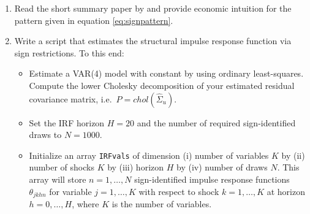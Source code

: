 \documentclass{article}
\begin{document}
\begin{enumerate}
\item Read the short summary paper by \textcite{Wolf_2022_WhatCanWe} and provide economic intuition for the pattern given in equation \eqref{eq:signpattern}.
\item Write a script that estimates the structural impulse response function via sign restrictions.
To this end:
	\begin{itemize}
	\item Estimate a VAR{(4)} model with constant by using ordinary least-squares.
	Compute the lower Cholesky decomposition of your estimated residual covariance matrix, i.e.\ \( P = chol(\hat{\Sigma}_u) \).
	\item Set the IRF horizon \(H=20\) and the number of required sign-identified draws to \(N=1000\).
	\item Initialize an array \texttt{IRFvals} of dimension
	(i) number of variables \(K\) by (ii) number of shocks \(K\) by (iii) horizon \(H\) by (iv) number of draws \(N\).
	This array will store \(n=1,\ldots,N\) sign-identified impulse response functions \(\theta_{jkhn}\) for variable \(j=1,\ldots,K\)
	with respect to shock \(k=1,\ldots,K\) at horizon \(h=0,\ldots,H\), where \(K\) is the number of variables.
	

\end{itemize}
\end{enumerate}
\end{document}
